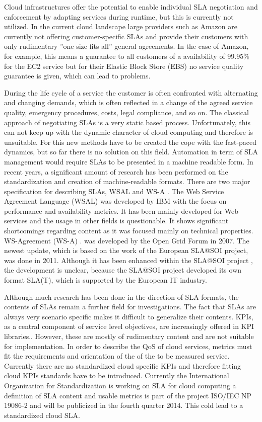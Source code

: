 Cloud infrastructures offer the potential to enable individual SLA negotiation and enforcement by adapting services during runtime, but this is currently not utilized. In the current cloud landscape large providers such as Amazon are currently not offering customer-specific SLAs and provide their customers with only rudimentary ”one size fits all” general agreements. In the case of Amazon, for example, this means a guarantee to all customers of a availability of 99.95\% for the EC2 service but for their Elastic Block Store (EBS) no service quality guarantee is given, which can lead to problems. 

During the life cycle of a service the customer is often confronted with alternating and changing demands, which is often reflected in a change of the agreed service quality, emergency procedures, costs, legal compliance, and so on. The classical approach of negotiating SLAs is a very static based process. Unfortunately, this can not keep up with the dynamic character of cloud computing and therefore is unsuitable. For this new methods have to be created the cope with the fast-paced dynamics, but so far there is no solution on this field. Automation in term  of SLA management would require SLAs to be presented in a machine readable form. In recent years, a significant amount of research has been performed on the standardization and creation of machine-readable formats. There are two major specification for describing SLAs, WSAL \cite{Ludwig03WSLA} and WS-A \cite{Kearney2011b}.  The Web Service Agreement Language (WSAL) \cite{Ludwig03WSLA} was developed by IBM with the focus on performance and availability metrics. It has been mainly developed for Web services and the usage in other fields is questionable. It shows significant shortcomings regarding content as it was focused mainly on technical properties. WS-Agreement (WS-A) \cite{Kearney2011b}.  was developed by the Open Grid Forum in 2007. The newest update, which is based on the work of the European SLA@SOI project, was done in 2011. Although it has been enhanced within the SLA@SOI project \cite{slasoi2011}, the development is unclear, because the SLA@SOI project developed its own format SLA(T), which is supported by the European IT industry.

Although much research has been done in the direction of SLA formats, the contents of SLAs remain a further field for investigations. The fact that SLAs are always very scenario specific makes it difficult to generalize their contents. KPIs, as a central component of service level objectives, are increasingly offered in KPI libraries.\cite{KPI}. However, these are mostly of rudimentary content and are not suitable for implementation. In order to describe the QoS of cloud services, metrics must fit the requirements and orientation of the of the to be measured service. Currently there are no standardized cloud specific KPIs and therefore fitting cloud KPIs standards have to be introduced. Currently the International Organization for Standardization is working on SLA for cloud computing a definition of SLA content and usable metrics is part of the project ISO/IEC NP 19086-2 \cite{ISOnew} and will be publicized in the fourth quarter 2014. This cold lead to a standardized cloud SLA.

